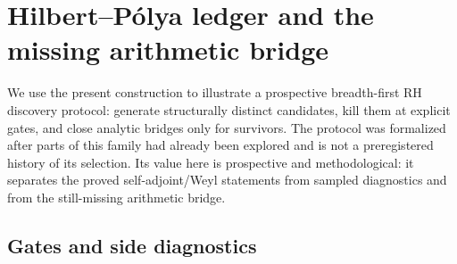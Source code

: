 \section{Hilbert--P\'olya ledger and the missing arithmetic bridge}
\label{sec:arithmetic-boundary}

We use the present construction to illustrate a prospective breadth-first RH
discovery protocol: generate structurally distinct candidates, kill them at
explicit gates, and close analytic bridges only for survivors.  The protocol
was formalized after parts of this family had already been explored and is
not a preregistered history of its selection.  Its value here is prospective
and methodological: it separates the proved self-adjoint/Weyl statements from
sampled diagnostics and from the still-missing arithmetic bridge.

\subsection{Gates and side diagnostics}

